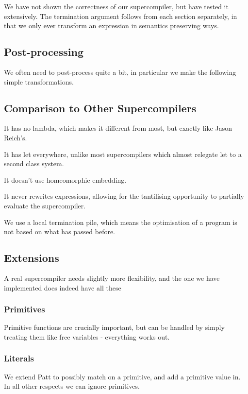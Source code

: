 \documentclass{sigplanconf}
\begin{document}
We have not shown the correctness of our supercompiler, but have tested it extensively. The termination argument follows from each section separately, in that we only ever transform an expression in semantics preserving ways.

\subsection{Post-processing}

We often need to post-process quite a bit, in particular we make the following simple transformations.

\subsection{Comparison to Other Supercompilers}

It has no lambda, which makes it different from most, but exactly like Jason Reich's.

It has let everywhere, unlike most supercompilers which almost relegate let to a second class system.

It doesn't use homeomorphic embedding.

It never rewrites expressions, allowing for the tantilising opportunity to partially evaluate the supercompiler.

We use a local termination pile, which means the optimisation of a program is not based on what has passed before.

\subsection{Extensions}
\label{sec:extensions}

A real supercompiler needs slightly more flexibility, and the one we have implemented does indeed have all these

\subsubsection{Primitives}

Primitive functions are crucially important, but can be handled by simply treating them like free variables - everything works out.

\subsubsection{Literals}

We extend Patt to possibly match on a primitive, and add a primitive value in. In all other respects we can ignore primitives.
\end{document}
